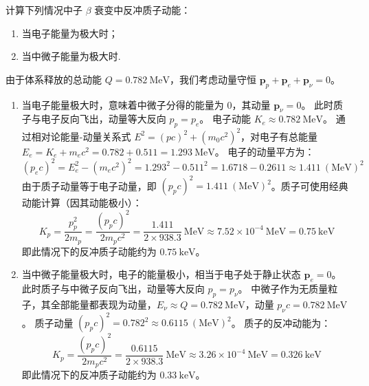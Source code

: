 \begin{exercise}\label{ex:29.22}
计算下列情况中子 $\beta$ 衰变中反冲质子动能：
\begin{enumerate}
  \item[(a)] 当电子能量为极大时；
  \item[(b)] 当中微子能量为极大时.
\end{enumerate}
\end{exercise}
\begin{solution}
由于体系释放的总动能 $Q = 0.782 \ \mathrm{MeV}$，我们考虑动量守恒 $\boldsymbol{p}_p + \boldsymbol{p}_e + \boldsymbol{p}_\nu = 0$。

\begin{enumerate}
    \item[(a)] 当电子能量极大时，意味着中微子分得的能量为 $0$，其动量 $\boldsymbol{p}_\nu = 0$。
    此时质子与电子反向飞出，动量等大反向 $p_p = p_e$。
    电子动能 $K_e \approx 0.782 \ \mathrm{MeV}$。
    通过相对论能量-动量关系式 $E^2 = (pc)^2 + (m_0 c^2)^2$，对电子有总能量 $E_e = K_e + m_e c^2 = 0.782 + 0.511 = 1.293 \ \mathrm{MeV}$。
    电子的动量平方为：
    $$ (p_e c)^2 = E_e^2 - (m_e c^2)^2 = 1.293^2 - 0.511^2 = 1.6718 - 0.2611 \approx 1.411 \ (\mathrm{MeV})^2 $$
    由于质子动量等于电子动量，即 $(p_p c)^2 = 1.411 \ (\mathrm{MeV})^2$。质子可使用经典动能计算（因其动能极小）：
    $$ K_p = \frac{p_p^2}{2m_p} = \frac{(p_p c)^2}{2 m_p c^2} = \frac{1.411}{2 \times 938.3} \ \mathrm{MeV} \approx 7.52 \times 10^{-4} \ \mathrm{MeV} = 0.75 \ \mathrm{keV} $$
    即此情况下的反冲质子动能约为 $0.75 \ \mathrm{keV}$。

    \item[(b)] 当中微子能量极大时，电子的能量极小，相当于电子处于静止状态 $\boldsymbol{p}_e = 0$。
    此时质子与中微子反向飞出，动量等大反向 $p_p = p_\nu$。
    中微子作为无质量粒子，其全部能量都表现为动量，$E_\nu \approx Q = 0.782 \ \mathrm{MeV}$，动量 $p_\nu c = 0.782 \ \mathrm{MeV}$。
    质子动量 $(p_p c)^2 = 0.782^2 \approx 0.6115 \ (\mathrm{MeV})^2$。
    质子的反冲动能为：
    $$ K_p = \frac{(p_p c)^2}{2 m_p c^2} = \frac{0.6115}{2 \times 938.3} \ \mathrm{MeV} \approx 3.26 \times 10^{-4} \ \mathrm{MeV} = 0.326 \ \mathrm{keV} $$
    即此情况下的反冲质子动能约为 $0.33 \ \mathrm{keV}$。
\end{enumerate}
\end{solution}


